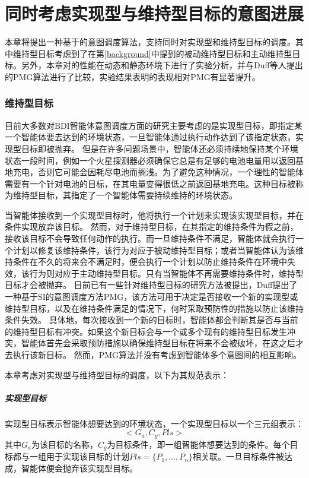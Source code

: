 \chapter{同时考虑实现型与维持型目标的意图进展}
本章将提出一种基于\SA 的意图调度算法\SAM ，\SAM 支持同时对实现型和维持型目标的调度。其中维持型目标考虑到了在第\ref{background}中提到的被动维持型目标和主动维持型目标。另外，本章对\SAM 的性能在动态和静态环境下进行了实验分析，并与Duff等人提出的PMG\cite{DBLP:conf/atal/DuffHT06}算法进行了比较，实验结果表明\SAM 的表现相对PMG有显著提升。
\subsection{维持型目标}
目前大多数对BDI智能体意图调度方面的研究主要考虑的是实现型目标，即指定某一个智能体要去达到的环境状态，一旦智能体通过执行动作达到了该指定状态，实现型目标即被抛弃。
但是在许多问题场景中，智能体还必须持续地保持某个环境状态一段时间，例如一个火星探测器必须确保它总是有足够的电池电量用以返回基地充电，否则它可能会因耗尽电池而搁浅。为了避免这种情况，一个理性的智能体需要有一个针对电池的目标，在其电量变得很低之前返回基地充电。这种目标被称为维持型目标，其指定了一个智能体需要持续维持的环境状态。


当智能体接收到一个实现型目标时，他将执行一个计划来实现该实现型目标，并在条件实现放弃该目标。
%
然而，对于维持型目标，在其指定的维持条件为假之前，接收该目标不会导致任何动作的执行。而一旦维持条件不满足，智能体就会执行一个计划以修复该维持条件，该行为对应于被动维持型目标；或者当智能体认为该维持条件在不久的将来会不满足时，便会执行一个计划以防止维持条件在环境中失效，该行为则对应于主动维持型目标。只有当智能体不再需要维持条件时，维持型目标才会被抛弃。
目前已有一些针对维持型目标的研究方法被提出，Duff\cite{DBLP:conf/atal/DuffHT06}提出了一种基于SI的意图调度方法PMG，该方法可用于决定是否接收一个新的实现型或维持型目标，以及在维持条件满足的情况下，何时采取预防性的措施以防止该维持条件失效。
具体地，每次接收到一个新的目标时，智能体都会判断其是否与当前的维持型目标有冲突。如果这个新目标会与一个或多个现有的维持型目标发生冲突，智能体首先会采取预防措施以确保维持型目标在将来不会被破坏，在这之后才去执行该新目标。
然而，PMG算法并没有考虑到智能体多个意图间的相互影响。

本章考虑对实现型与维持型目标的调度，以下为其规范表示：
\paragraph{实现型目标}
实现型目标表示智能体想要达到的环境状态，一个实现型目标以一个三元组表示：
$$<G_a,C_g,Pls>$$
其中$G_a$为该目标的名称，$C_g$为目标条件，即一组智能体想要达到的条件。每个目标都与一组用于实现该目标的计划$Pls=\{P_1,\dots,P_n\}$相关联。一旦目标条件被达成，智能体便会抛弃该实现型目标。
